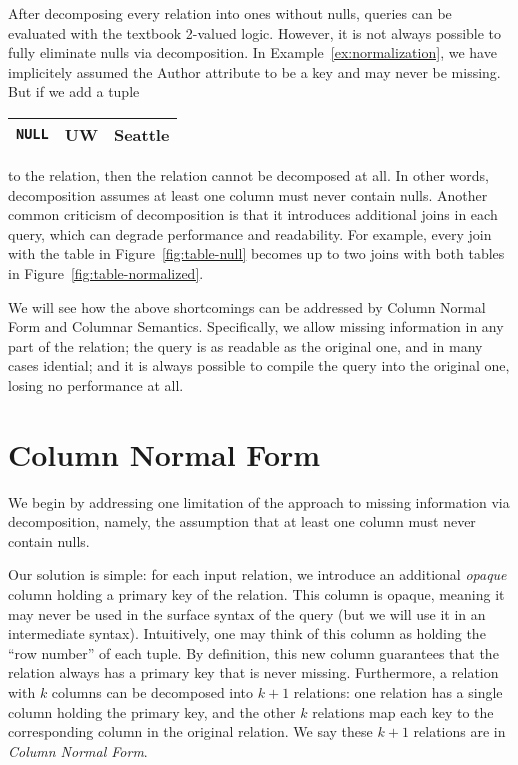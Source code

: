 \documentclass[sigconf,nonacm]{acmart}
\begin{document}
After decomposing every relation into ones without nulls,
 queries can be evaluated with the textbook 2-valued logic.
However, it is not always possible to fully eliminate nulls via decomposition.
In Example~\ref{ex:normalization}, 
 we have implicitely assumed the \textsf{Author} attribute 
 to be a key and may never be missing.
But if we add a tuple 
%
\begin{tabular}{|c|c|c|}
\hline
\lstinline|NULL| & UW & Seattle\\
\hline
\end{tabular}
%
 to the relation, 
 then the relation cannot be decomposed at all.
In other words, decomposition assumes at least one column must never contain nulls. 
Another common criticism of decomposition is that
 it introduces additional joins in each query, 
 which can degrade performance and readability.
For example, every join with the table in Figure~\ref{fig:table-null}
 becomes up to two joins with both tables in Figure~\ref{fig:table-normalized}.

We will see how the above shortcomings can be addressed 
 by Column Normal Form and Columnar Semantics.
Specifically, we allow missing information in any part of the relation;
 the query is as readable as the original one, and in many cases idential;
 and it is always possible to compile the query into the original one,
 losing no performance at all.

\section{Column Normal Form}
\label{sec:cnf}

We begin by addressing one limitation of the approach
 to missing information via decomposition,
 namely, the assumption that at least one column must never contain nulls.

Our solution is simple:
 for each input relation, 
 we introduce an additional {\em opaque} column 
 holding a primary key of the relation.
This column is opaque, meaning it may never be used 
 in the surface syntax of the query 
 (but we will use it in an intermediate syntax).
Intuitively, one may think of this column as holding 
 the ``row number'' of each tuple.
By definition, this new column guarantees
 that the relation always has a primary key that is never missing.
Furthermore, a relation with $k$ columns can be decomposed
 into $k+1$ relations:
 one relation has a single column holding the primary key,
 and the other $k$ relations 
 map each key to the corresponding column in the original relation.
We say these $k+1$ relations are in {\em Column Normal Form}.
\end{document}
